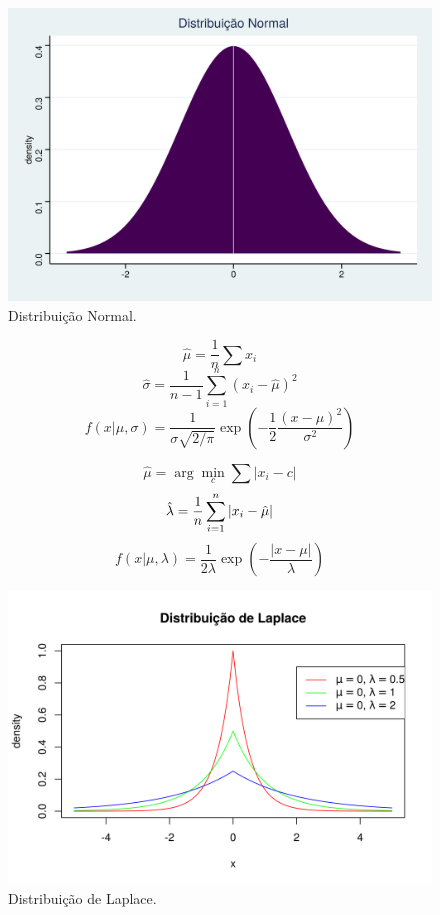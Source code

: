 \documentclass[a4paper, 12pt]{article}
\begin{document}
\hspace{-1.6cm}\begin{minipage}{0.5\textwidth}
\begin{figure}[H]

{\centering \includegraphics[width=0.7\linewidth]{images/dist_normal-1} 

}

\caption{Distribuição Normal.}\label{fig:dist_normal}
\end{figure}

\end{minipage}
\begin{minipage}{0.5\textwidth}

$$\hat \mu = \frac{1}{n}\sum x_i$$
$$\hat \sigma = \frac{1}{n-1} \sum_{i=1}^n (x_i - \hat \mu)^2$$
$$f(x|\mu, \sigma) = \frac{1}{\sigma\sqrt{2/\pi}}\exp \left (-\frac{1}{2}\frac{(x - \mu)^2}{\sigma^2} \right )$$
\end{minipage}
\hspace{-1.6cm}\begin{minipage}{0.5\textwidth}
$$\hat \mu = \arg\min_c \sum |x_i - c|$$
$$\hat \lambda = \frac{1}{n} \sum_{i=1}^n |x_i - \hat \mu| \\$$
$$f(x|\mu, \lambda) = \frac{1}{2 \lambda} \exp \left ( -\frac{|x - \mu|}{\lambda}\right )$$
\end{minipage}
\begin{minipage}{0.5\textwidth}
\begin{figure}[H]

{\centering \includegraphics[width=0.7\linewidth]{images/dist_Laplace-1} 

}

\caption{Distribuição de Laplace.}\label{fig:dist_Laplace}
\end{figure}
\end{minipage}
\end{document}
